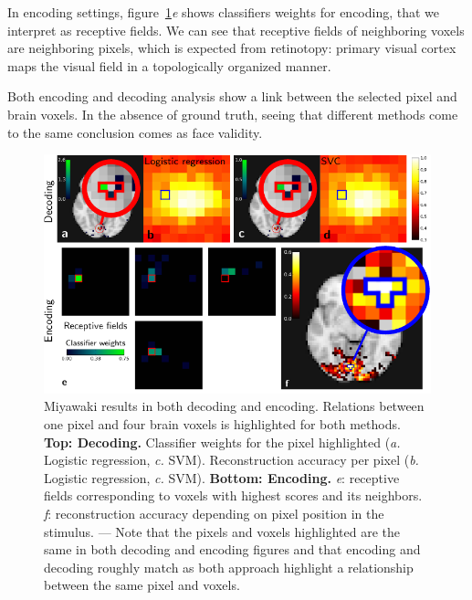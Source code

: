 \documentclass{frontiersSCNS} %
\begin{document}
In encoding settings, figure~\ref{fig:miyawaki}\textit{e} shows classifiers
weights for encoding, that we interpret as receptive fields. We can
see that receptive fields of neighboring voxels are neighboring
pixels, which is expected from retinotopy: primary visual
cortex maps the visual field in a topologically organized manner.

Both encoding and decoding analysis show a link between the selected
pixel and brain voxels. In the absence of ground truth, seeing that
different methods come to the same conclusion comes as face validity.


\begin{figure}[hbtp]
  \begin{center}
    \includegraphics[width=\linewidth]{scripts/miyawaki/figure}
  \end{center}
  \caption{
      Miyawaki results in both decoding and encoding. Relations between one
      pixel and four brain voxels is highlighted for both methods.
      \textbf{Top: Decoding.} Classifier weights for the pixel
      highlighted (\textit{a.} Logistic regression, \textit{c.} SVM).
      Reconstruction accuracy per pixel
      (\textit{b.} Logistic
      regression, \textit{c.} SVM). 
      \textbf{Bottom: Encoding.} \textit{e}: receptive fields corresponding to
       voxels with highest scores and its neighbors.
       \textit{f}: reconstruction accuracy depending on 
	  pixel position in the stimulus. --- Note that the pixels and voxels highlighted are the same in 
      both decoding and encoding figures and that encoding and decoding
      roughly match as both approach highlight a relationship between the
      same pixel and voxels.
}
\label{fig:miyawaki}
\end{figure}
\end{document}
